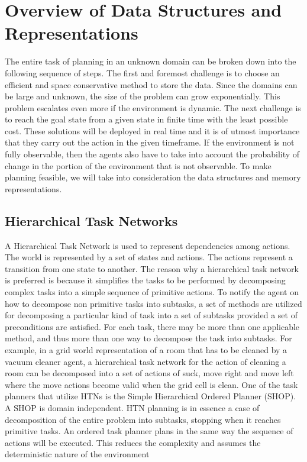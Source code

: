 \documentclass[tog]{acmsiggraph}
\begin{document}
\section{Overview of Data Structures and Representations}
The entire task of planning in an unknown domain can be broken down
into the following sequence of steps. The first and foremost challenge
is to choose an efficient and space conservative method to store the
data. Since the domains can be large and unknown, the size of the
problem can grow exponentially. This problem escalates even more if
the environment is dynamic. The next challenge is to reach the goal
state from a given state in finite time with the least possible cost.
These solutions will be deployed in real time and it is of utmost
importance that they carry out the action in the given timeframe. If
the environment is not fully observable, then the agents also have to
take into account the probability of change in the portion of the
environment that is not observable. To make planning feasible, we will
take into consideration the data structures and memory
representations.

\subsection{Hierarchical Task Networks}

A Hierarchical Task Network is used to represent dependencies among
actions. The world is represented by a set of states and actions. The
actions represent a transition from one state to another. The reason
why a hierarchical task network is preferred is because it simplifies
the tasks to be performed by decomposing complex tasks into a simple
sequence of primitive actions. To notify the agent on how to decompose
non primitive tasks into subtasks, a set of methods are utilized for
decomposing a particular kind of task into a set of subtasks provided
a set of preconditions are satisfied. For each task, there may be more
than one applicable method, and thus more than one way to decompose
the task into subtasks. For example, in a grid
world representation of a room that has to be cleaned by a vacuum
cleaner agent, a hierarchical task network for the action of cleaning
a room can be decomposed into a set of actions of suck, move right and
move left where the move actions become valid when the grid cell is
clean. One of the task planners that utilize HTNs is the Simple
Hierarchical Ordered Planner (SHOP). A SHOP is domain independent. HTN
planning is in essence a case of decomposition of the entire problem
into subtasks, stopping when it reaches primitive tasks. An ordered
task planner plans in the same way the sequence of actions will be
executed. This reduces the complexity and assumes the deterministic
nature of the environment
\end{document}

